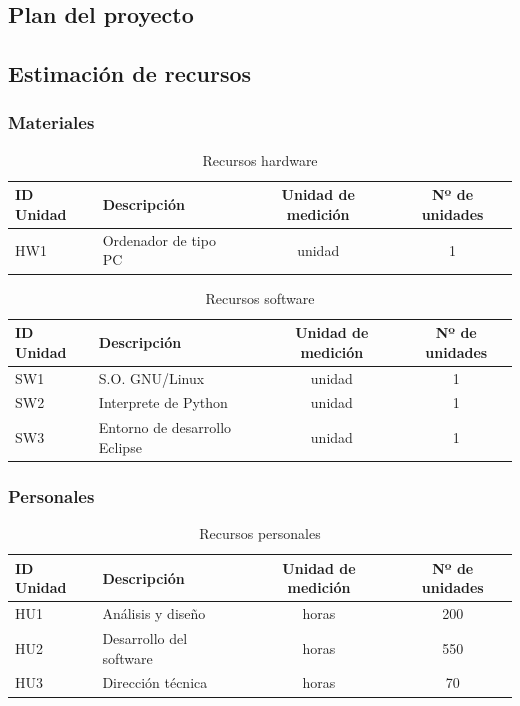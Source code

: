 
\subsection{Plan del proyecto}

\subsection{Estimación de recursos}

\subsubsection{Materiales}

\begin{table}[H]
 \begin{center}
  \begin{tabular}{|l|l|c|c|}
	\hline
	\textbf{ID Unidad} & \textbf{Descripción} & \textbf{Unidad de medición} & \textbf{Nº de unidades} \\
	\hline
	HW1 & Ordenador de tipo PC & unidad & 1 \\
	\hline
  \end{tabular}
  \caption{Recursos hardware}
 \end{center}
\end{table}

\begin{table}[H]
 \begin{center}
  \begin{tabular}{|l|l|c|c|}
	\hline
	\textbf{ID Unidad} & \textbf{Descripción} & \textbf{Unidad de medición} & \textbf{Nº de unidades} \\
	\hline
	SW1 & S.O. GNU/Linux & unidad & 1 \\
	\hline
	SW2 & Interprete de Python & unidad & 1 \\
	\hline
	SW3 & Entorno de desarrollo Eclipse & unidad & 1 \\
	\hline
  \end{tabular}
  \caption{Recursos software}
 \end{center}
\end{table}

\subsubsection{Personales}

\begin{table}[H]
 \begin{center}
  \begin{tabular}{|l|l|c|c|}
	\hline
	\textbf{ID Unidad} & \textbf{Descripción} & \textbf{Unidad de medición} & \textbf{Nº de unidades} \\
	\hline
	HU1 & Análisis y diseño & horas & 200 \\
	\hline
	HU2 & Desarrollo del software & horas & 550 \\
	\hline
	HU3 & Dirección técnica & horas & 70 \\
	\hline
  \end{tabular}
  \caption{Recursos personales}
 \end{center}
\end{table}

